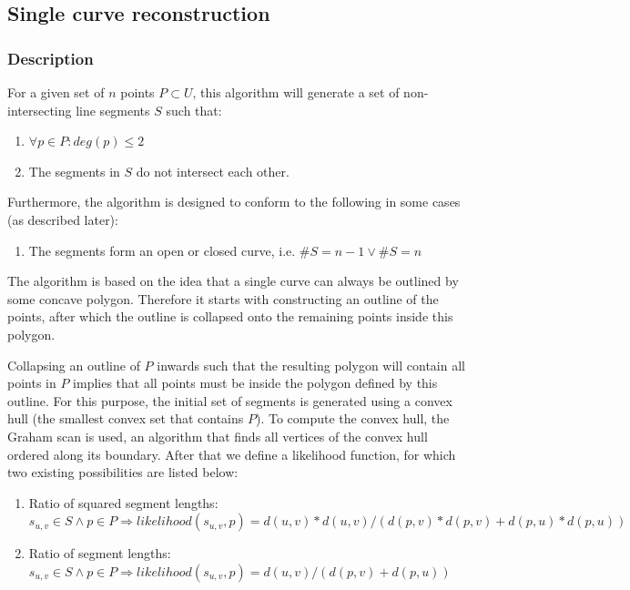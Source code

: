\documentclass[11pt]{article}
\begin{document}
\subsection{Single curve reconstruction}
\subsubsection{Description}
For a given set of $n$ points $P \subset U$, this algorithm will generate a set of non-intersecting line segments $S$ such that:

\noindent\begin{enumerate}\topsep=0pt\itemsep=0pt\parsep=0pt
\item $\forall p \in P : deg(p) \leq 2$
\item The segments in $S$ do not intersect each other.
\end{enumerate}

Furthermore, the algorithm is designed to conform to the following in some cases (as described later):

\noindent\begin{enumerate}\topsep=0pt\itemsep=0pt\parsep=0pt
\item The segments form an open or closed curve, i.e. $\#S = n-1 \vee \#S = n$
\end{enumerate}

The algorithm is based on the idea that a single curve can always be outlined by some concave polygon. Therefore it starts with constructing an outline of the points, after which the outline is collapsed onto the remaining points inside this polygon.

Collapsing an outline of $P$ inwards such that the resulting polygon will contain all points in $P$ implies that all points must be inside the polygon defined by this outline.
For this purpose, the initial set of segments is generated using a convex hull (the smallest convex set that contains $P$). To compute the convex hull, the Graham scan\cite{convex} is used, an algorithm that finds all vertices of the convex hull ordered along its boundary.
After that we define a likelihood function, for which two existing possibilities are listed below:

\noindent
\begin{enumerate}
\topsep=0pt
\itemsep=0pt
\parsep=0pt
\item Ratio of squared segment lengths:\\
$s_{u,v} \in S \wedge p \in P \Rightarrow likelihood(s_{u,v}, p) = d(u, v)*d(u, v)/(d(p, v)*d(p, v)+d(p, u)*d(p, u))$
\item Ratio of segment lengths:\\
$s_{u,v} \in S \wedge p \in P \Rightarrow likelihood(s_{u,v}, p) = d(u, v)/(d(p, v)+d(p, u))$
\end{enumerate}
\end{document}
